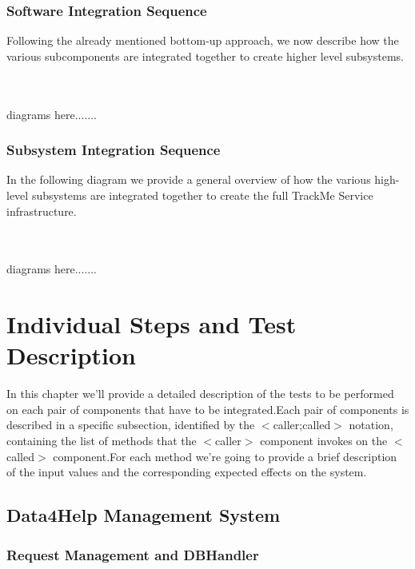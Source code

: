 \documentclass[a4paper, hidelinks, 12pt]{report}
\begin{document}
	\subsection{Software Integration Sequence}
	Following the already mentioned bottom-up approach, we now describe how the various subcomponents are integrated together to create higher level subsystems.\\\\\
			
		diagrams here.......
	\subsection{Subsystem Integration Sequence}
	In the following diagram we provide a general overview of how the various high-level subsystems are integrated together to create the full TrackMe Service infrastructure.\\\\\
			
			diagrams here.......
			
	\chapter{Individual Steps and Test Description}
	In this chapter we'll provide a detailed description of the tests to be performed on each pair of components that have to be integrated.Each pair of components is described in a specific subsection, identified by the $<$caller;called$>$ notation, containing the list of methods that the $<$caller$>$ component invokes on the $<$called$>$ component.For each method we're going to provide a brief description of the input values and the corresponding expected effects on the system.

	\section{ Data4Help Management System}
	\subsection{Request Management and DBHandler}
\end{document}
